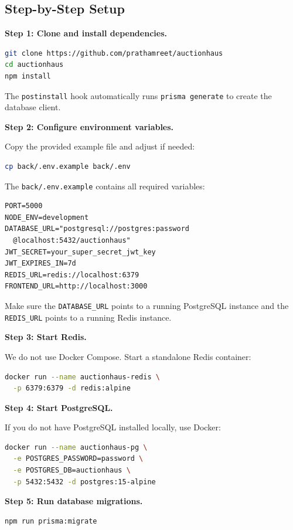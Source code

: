 \documentclass[11pt]{article}
\begin{document}
\subsection{Step-by-Step Setup}

\textbf{Step 1: Clone and install dependencies.}
\begin{lstlisting}[language=bash]
git clone https://github.com/prathamreet/auctionhaus
cd auctionhaus
npm install
\end{lstlisting}
The \texttt{postinstall} hook automatically runs
\texttt{prisma generate} to create the database client.

\textbf{Step 2: Configure environment variables.}

Copy the provided example file and adjust if needed:
\begin{lstlisting}[language=bash]
cp back/.env.example back/.env
\end{lstlisting}

The \texttt{back/.env.example} contains all required variables:
\begin{lstlisting}[language={},caption={back/.env.example contents.}]
PORT=5000
NODE_ENV=development
DATABASE_URL="postgresql://postgres:password
  @localhost:5432/auctionhaus"
JWT_SECRET=your_super_secret_jwt_key
JWT_EXPIRES_IN=7d
REDIS_URL=redis://localhost:6379
FRONTEND_URL=http://localhost:3000
\end{lstlisting}

Make sure the \texttt{DATABASE\_URL} points to a running PostgreSQL
instance and the \texttt{REDIS\_URL} points to a running Redis instance.

\textbf{Step 3: Start Redis.}

We do not use Docker Compose. Start a standalone Redis container:
\begin{lstlisting}[language=bash]
docker run --name auctionhaus-redis \
  -p 6379:6379 -d redis:alpine
\end{lstlisting}

\textbf{Step 4: Start PostgreSQL.}

If you do not have PostgreSQL installed locally, use Docker:
\begin{lstlisting}[language=bash]
docker run --name auctionhaus-pg \
  -e POSTGRES_PASSWORD=password \
  -e POSTGRES_DB=auctionhaus \
  -p 5432:5432 -d postgres:15-alpine
\end{lstlisting}

\textbf{Step 5: Run database migrations.}
\begin{lstlisting}[language=bash]
npm run prisma:migrate
\end{lstlisting}
\end{document}
